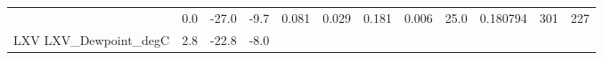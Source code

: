 \documentclass[11pt]{article}
\begin{document}
\begin{longtable}[]{@{}llllllllllll@{}}
\begin{minipage}[t]{0.18\columnwidth}
\end{minipage} & \begin{minipage}[t]{0.04\columnwidth}\raggedright\strut
0.0\strut
\end{minipage} & \begin{minipage}[t]{0.04\columnwidth}\raggedright\strut
-27.0\strut
\end{minipage} & \begin{minipage}[t]{0.04\columnwidth}\raggedright\strut
-9.7\strut
\end{minipage} & \begin{minipage}[t]{0.04\columnwidth}\raggedright\strut
0.081\strut
\end{minipage} & \begin{minipage}[t]{0.05\columnwidth}\raggedright\strut
0.029\strut
\end{minipage} & \begin{minipage}[t]{0.04\columnwidth}\raggedright\strut
0.181\strut
\end{minipage} & \begin{minipage}[t]{0.04\columnwidth}\raggedright\strut
0.006\strut
\end{minipage} & \begin{minipage}[t]{0.05\columnwidth}\raggedright\strut
25.0\strut
\end{minipage} & \begin{minipage}[t]{0.05\columnwidth}\raggedright\strut
0.180794\strut
\end{minipage} & \begin{minipage}[t]{0.05\columnwidth}\raggedright\strut
301\strut
\end{minipage} & \begin{minipage}[t]{0.07\columnwidth}\raggedright\strut
227\strut
\end{minipage}\tabularnewline
\begin{minipage}[t]{0.18\columnwidth}\raggedright\strut
LXV LXV\_Dewpoint\_degC\strut
\end{minipage} & \begin{minipage}[t]{0.04\columnwidth}\raggedright\strut
2.8\strut
\end{minipage} & \begin{minipage}[t]{0.04\columnwidth}\raggedright\strut
-22.8\strut
\end{minipage} & \begin{minipage}[t]{0.04\columnwidth}\raggedright\strut
-8.0\strut
\end{minipage} & \begin{minipage}[t]{0.04\columnwidth}\raggedright\strut

\end{minipage}
\end{longtable}
\end{document}
